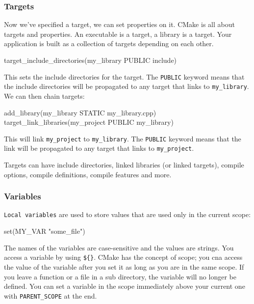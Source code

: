 \subsubsection{Targets}

Now we've specified a target, we can set properties on it.
CMake is all about targets and properties. An executable is a target, a library is a target. Your
application is built as a collection of targets depending on each other.


\begin{codeblock}[language=bash][language=C++, numbers=none]
target_include_directories(my_library PUBLIC include)
\end{codeblock}

This sets the include directories for the target. The \texttt{PUBLIC} keyword means that the include directories will be propagated to any target that links to \texttt{my\_library}.
We can then chain targets:

\begin{codeblock}[language=bash][language=C++, numbers=none]
add_library(my_library STATIC my_library.cpp)
target_link_libraries(my_project PUBLIC my_library)
\end{codeblock}

This will link \texttt{my\_project} to \texttt{my\_library}. The \texttt{PUBLIC} keyword means that the link will be propagated to any target that links to \texttt{my\_project}.

Targets can have include directories, linked libraries (or linked targets), compile options, compile definitions, 
compile features and more.

\subsubsection{Variables}

\texttt{Local variables} are used to store values that are used only in the current scope:

\begin{codeblock}[language=bash][language=C++, numbers=none]
set(MY_VAR "some_file") 
\end{codeblock}

The names of the variables are case-sensitive and the values are strings. You access a variable by using \texttt{\$\{\}}.
CMake has the concept of scope; you cna access the value of the variable after you set it as long as you are in the same scope. If you leave a function or a file in a sub directory, the variable will 
no longer be defined. You can set a variable in the scope immediately above your current one with \texttt{PARENT\_SCOPE} at the end. 

